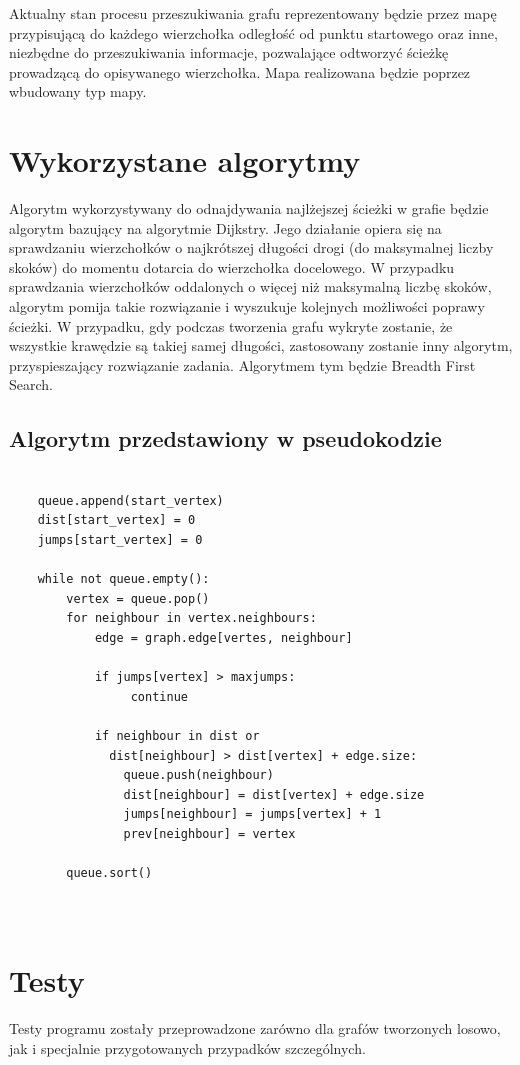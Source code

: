 \documentclass[a4paper, 12pt]{article}
\begin{document}
	Aktualny stan procesu przeszukiwania grafu reprezentowany będzie przez mapę przypisującą do każdego wierzchołka odległość od punktu startowego oraz inne, niezbędne do przeszukiwania informacje, pozwalające odtworzyć ścieżkę prowadzącą do opisywanego wierzchołka.
	Mapa realizowana będzie poprzez wbudowany typ mapy.
	
	\section{Wykorzystane algorytmy}
	Algorytm wykorzystywany do odnajdywania najlżejszej ścieżki w grafie będzie algorytm bazujący na algorytmie Dijkstry. Jego działanie opiera się na sprawdzaniu wierzchołków o najkrótszej długości drogi (do maksymalnej liczby skoków) do momentu dotarcia do wierzchołka docelowego.
	W przypadku sprawdzania wierzchołków oddalonych o więcej niż maksymalną liczbę skoków, algorytm pomija takie rozwiązanie i wyszukuje kolejnych możliwości poprawy ścieżki.
	W przypadku, gdy podczas tworzenia grafu wykryte zostanie, że wszystkie krawędzie są takiej samej długości, zastosowany zostanie inny algorytm, przyspieszający rozwiązanie zadania. Algorytmem tym będzie Breadth First Search.
	\subsection{Algorytm przedstawiony w pseudokodzie}
	\begin{verbatim}
	
	queue.append(start_vertex)
	dist[start_vertex] = 0
	jumps[start_vertex] = 0
	
	while not queue.empty():
	    vertex = queue.pop()
	    for neighbour in vertex.neighbours:
	        edge = graph.edge[vertes, neighbour]
	
	        if jumps[vertex] > maxjumps:
	             continue
	             
	        if neighbour in dist or 
	          dist[neighbour] > dist[vertex] + edge.size:
	            queue.push(neighbour)
	            dist[neighbour] = dist[vertex] + edge.size
	            jumps[neighbour] = jumps[vertex] + 1
	            prev[neighbour] = vertex
	    
	    queue.sort()
	    
	
	\end{verbatim}
	
	\section{Testy}
	Testy programu zostały przeprowadzone zarówno dla grafów tworzonych losowo, jak i specjalnie przygotowanych przypadków szczególnych.
\end{document}
